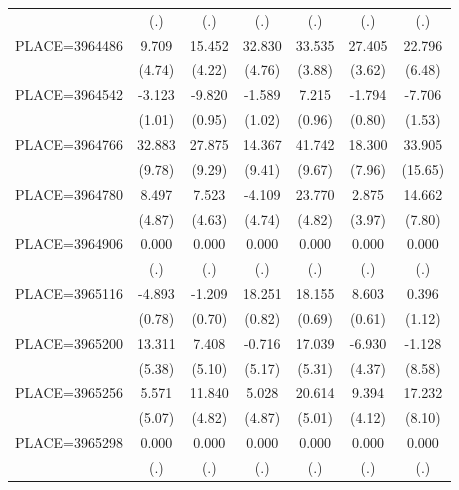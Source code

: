 {\begin{tabular}{l*{6}{c}}
                    &         (.)&         (.)&         (.)&         (.)&         (.)&         (.)\\
PLACE=3964486       &       9.709&      15.452&      32.830&      33.535&      27.405&      22.796\\
                    &      (4.74)&      (4.22)&      (4.76)&      (3.88)&      (3.62)&      (6.48)\\
PLACE=3964542       &      -3.123&      -9.820&      -1.589&       7.215&      -1.794&      -7.706\\
                    &      (1.01)&      (0.95)&      (1.02)&      (0.96)&      (0.80)&      (1.53)\\
PLACE=3964766       &      32.883&      27.875&      14.367&      41.742&      18.300&      33.905\\
                    &      (9.78)&      (9.29)&      (9.41)&      (9.67)&      (7.96)&     (15.65)\\
PLACE=3964780       &       8.497&       7.523&      -4.109&      23.770&       2.875&      14.662\\
                    &      (4.87)&      (4.63)&      (4.74)&      (4.82)&      (3.97)&      (7.80)\\
PLACE=3964906       &       0.000&       0.000&       0.000&       0.000&       0.000&       0.000\\
                    &         (.)&         (.)&         (.)&         (.)&         (.)&         (.)\\
PLACE=3965116       &      -4.893&      -1.209&      18.251&      18.155&       8.603&       0.396\\
                    &      (0.78)&      (0.70)&      (0.82)&      (0.69)&      (0.61)&      (1.12)\\
PLACE=3965200       &      13.311&       7.408&      -0.716&      17.039&      -6.930&      -1.128\\
                    &      (5.38)&      (5.10)&      (5.17)&      (5.31)&      (4.37)&      (8.58)\\
PLACE=3965256       &       5.571&      11.840&       5.028&      20.614&       9.394&      17.232\\
                    &      (5.07)&      (4.82)&      (4.87)&      (5.01)&      (4.12)&      (8.10)\\
PLACE=3965298       &       0.000&       0.000&       0.000&       0.000&       0.000&       0.000\\
                    &         (.)&         (.)&         (.)&         (.)&         (.)&         (.)\\

\end{tabular}}
